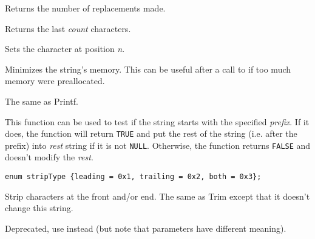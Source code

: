 Returns the number of replacements made.

\label{wxstringright}


Returns the last {\it count} characters.

\label{wxstringsetchar}


Sets the character at position {\it n}.

\label{wxstringshrink}


Minimizes the string's memory. This can be useful after a call to 
 if too much memory were preallocated.

\label{wxstringsprintf}


The same as Printf.

\label{wxstringstartswith}


This function can be used to test if the string starts with the specified 
{\it prefix}. If it does, the function will return {\tt TRUE} and put the rest
of the string (i.e. after the prefix) into {\it rest} string if it is not 
{\tt NULL}. Otherwise, the function returns {\tt FALSE} and doesn't modify the 
{\it rest}.

\label{wxstringstrip}

\begin{verbatim}
enum stripType {leading = 0x1, trailing = 0x2, both = 0x3};
\end{verbatim}


Strip characters at the front and/or end. The same as Trim except that it
doesn't change this string.

\label{wxstringsubstring}


Deprecated, use  instead (but note that parameters
have different meaning).

